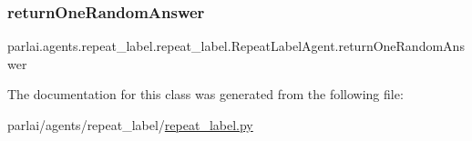 \subsubsection{\texorpdfstring{return\+One\+Random\+Answer}{returnOneRandomAnswer}}
{\footnotesize\ttfamily parlai.\+agents.\+repeat\+\_\+label.\+repeat\+\_\+label.\+Repeat\+Label\+Agent.\+return\+One\+Random\+Answer}



The documentation for this class was generated from the following file\+:\begin{DoxyCompactItemize}
\item 
parlai/agents/repeat\+\_\+label/\hyperlink{repeat__label_8py}{repeat\+\_\+label.\+py}\end{DoxyCompactItemize}
